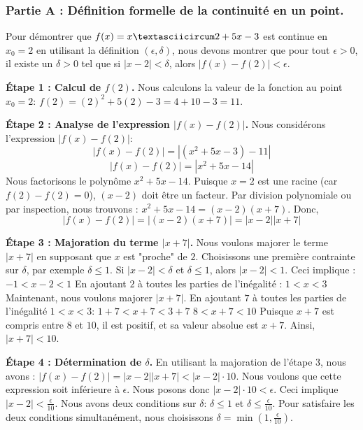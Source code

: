 \documentclass[12pt,a4paper]{report}
\begin{document}
\subsubsection{Partie A : Définition formelle de la continuité en un point.}

Pour démontrer que $f(x) = x\textasciicircum 2 + 5x - 3$ est continue en $x_0 = 2$ en utilisant la définition $(\epsilon, \delta)$, nous devons montrer que pour tout $\epsilon > 0$, il existe un $\delta > 0$ tel que si $|x - 2| < \delta$, alors $|f(x) - f(2)| < \epsilon$.

\textbf{Étape 1 : Calcul de $f(2)$.}
Nous calculons la valeur de la fonction au point $x_0 = 2$:
$f(2) = (2)^2 + 5(2) - 3 = 4 + 10 - 3 = 11$.

\textbf{Étape 2 : Analyse de l'expression $|f(x) - f(2)|$.}
Nous considérons l'expression $|f(x) - f(2)|$:
$$
|f(x) - f(2)| = |(x^2 + 5x - 3) - 11|
$$
$$
|f(x) - f(2)| = |x^2 + 5x - 14|
$$
Nous factorisons le polynôme $x^2 + 5x - 14$. Puisque $x=2$ est une racine (car $f(2)-f(2)=0$), $(x-2)$ doit être un facteur.
Par division polynomiale ou par inspection, nous trouvons :
$x^2 + 5x - 14 = (x-2)(x+7)$.
Donc,
$$
|f(x) - f(2)| = |(x-2)(x+7)| = |x-2||x+7|
$$

\textbf{Étape 3 : Majoration du terme $|x+7|$.}
Nous voulons majorer le terme $|x+7|$ en supposant que $x$ est "proche" de $2$.
Choisissons une première contrainte sur $\delta$, par exemple $\delta \le 1$.
Si $|x - 2| < \delta$ et $\delta \le 1$, alors $|x - 2| < 1$.
Ceci implique :
$-1 < x - 2 < 1$
En ajoutant $2$ à toutes les parties de l'inégalité :
$1 < x < 3$
Maintenant, nous voulons majorer $|x+7|$. En ajoutant $7$ à toutes les parties de l'inégalité $1 < x < 3$:
$1 + 7 < x + 7 < 3 + 7$
$8 < x + 7 < 10$
Puisque $x+7$ est compris entre $8$ et $10$, il est positif, et sa valeur absolue est $x+7$.
Ainsi, $|x+7| < 10$.

\textbf{Étape 4 : Détermination de $\delta$.}
En utilisant la majoration de l'étape 3, nous avons :
$|f(x) - f(2)| = |x-2||x+7| < |x-2| \cdot 10$.
Nous voulons que cette expression soit inférieure à $\epsilon$.
Nous posons donc $|x-2| \cdot 10 < \epsilon$.
Ceci implique $|x-2| < \frac{\epsilon}{10}$.
Nous avons deux conditions sur $\delta$: $\delta \le 1$ et $\delta \le \frac{\epsilon}{10}$.
Pour satisfaire les deux conditions simultanément, nous choisissons $\delta = \min\left(1, \frac{\epsilon}{10}\right)$.
\end{document}
